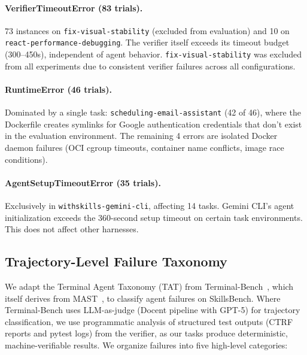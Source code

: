 \paragraph{VerifierTimeoutError (83 trials).}
73 instances on \texttt{fix-visual-stability} (excluded from evaluation) and 10 on \texttt{react-performance-debugging}. The verifier itself exceeds its timeout budget (300--450s), independent of agent behavior. \texttt{fix-visual-stability} was excluded from all experiments due to consistent verifier failures across all configurations.

\paragraph{RuntimeError (46 trials).}
Dominated by a single task: \texttt{scheduling-email-assistant} (42 of 46), where the Dockerfile creates symlinks for Google authentication credentials that don't exist in the evaluation environment. The remaining 4 errors are isolated Docker daemon failures (OCI cgroup timeouts, container name conflicts, image race conditions).

\paragraph{AgentSetupTimeoutError (35 trials).}
Exclusively in \texttt{withskills-gemini-cli}, affecting 14 tasks. Gemini CLI's agent initialization exceeds the 360-second setup timeout on certain task environments. This does not affect other harnesses.

\subsection{Trajectory-Level Failure Taxonomy}
\label{app:failure-taxonomy}

We adapt the Terminal Agent Taxonomy (TAT) from Terminal-Bench~\citep{merrill2026terminalbenchbenchmarkingagentshard}, which itself derives from MAST~\citep{pan2025multiagentfail}, to classify agent failures on SkillsBench. Where Terminal-Bench uses LLM-as-judge (Docent pipeline with GPT-5) for trajectory classification, we use programmatic analysis of structured test outputs (CTRF reports and pytest logs) from the verifier, as our tasks produce deterministic, machine-verifiable results. We organize failures into five high-level categories:

